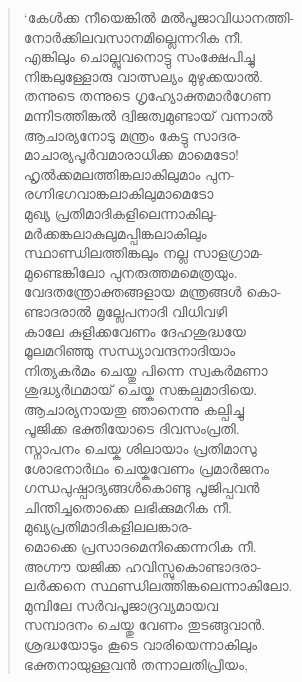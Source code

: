 \begin{verse}
‘കേള്‍ക്ക നീയെങ്കില്‍ മല്‍പൂജാവിധാനത്തി-\\
നോര്‍ക്കിലവസാനമില്ലെന്നറിക നീ.\\
എങ്കിലും ചൊല്ലുവനൊട്ടു സംക്ഷേപിച്ചു\\
നിങ്കലുള്ളോരു വാത്സല്യം മുഴുക്കയാല്‍.\\
തന്നുടെ തന്നുടെ ഗൃഹ്യോക്തമാര്‍ഗേണ\\
മന്നിടത്തിങ്കല്‍ ദ്വിജത്വമുണ്ടായ് വന്നാല്‍\\
ആചാര്യനോടു മന്ത്രം കേട്ടു സാദര-\\
മാചാര്യപൂര്‍വമാരാധിക്ക മാമെടോ!\\
ഹൃല്‍ക്കമലത്തിങ്കലാകിലുമാം പുന-\\
രഗ്നിഭഗവാങ്കലാകിലുമാമെടോ\\
മുഖ്യ പ്രതിമാദികളിലെന്നാകിലു-\\
മര്‍ക്കങ്കലാകുലുമപ്പിങ്കലാകിലും\\
സ്ഥാണ്ഡിലത്തിങ്കലും നല്ല സാളഗ്രാമ-\\
മുണ്ടെങ്കിലോ പുനരുത്തമമെത്രയും.\\
വേദതന്ത്രോക്തങ്ങളായ മന്ത്രങ്ങള്‍ കൊ-\\
ണ്ടാദരാല്‍ മൃല്ലേപനാദി വിധിവഴി\\
കാലേ കുളിക്കവേണം ദേഹശുദ്ധയേ\\
മൂലമറിഞ്ഞു സന്ധ്യാവന്ദനാദിയാം\\
നിത്യകര്‍മം ചെയ്തു പിന്നെ സ്വകര്‍മണാ\\
ശുദ്ധ്യര്‍ഥമായ് ചെയ്ക സങ്കല്പമാദിയെ.\\
ആചാര്യനായതു ഞാനെന്നു കല്പിച്ചു\\
പൂജിക്ക ഭക്തിയോടെ ദിവസംപ്രതി.\\
സ്നാപനം ചെയ്ക ശിലായാം പ്രതിമാസു\\
ശോഭനാര്‍ഥം ചെയ്കവേണം പ്രമാര്‍ജനം\\
ഗന്ധപുഷ്പാദ്യങ്ങള്‍കൊണ്ടു പൂജിപ്പവന്‍\\
ചിന്തിച്ചതൊക്കെ ലഭിക്കുമറിക നീ.\\
മുഖ്യപ്രതിമാദികളിലലങ്കാര-\\
മൊക്കെ പ്രസാദമെനിക്കെന്നറിക നീ.\\
അഗ്നൗ യജിക്ക ഹവിസ്സുകൊണ്ടാദരാ-\\
ലര്‍ക്കനെ സ്ഥണ്ഡിലത്തിങ്കലെന്നാകിലോ.\\
മുമ്പിലേ സര്‍വപൂജാദ്രവ്യമായവ\\
സമ്പാദനം ചെയ്തു വേണം തുടങ്ങുവാന്‍.\\
ശ്രദ്ധയോടും കൂടെ വാരിയെന്നാകിലും\\
ഭക്തനായുള്ളവന്‍ തന്നാലതിപ്രിയം,\\

\end{verse}
